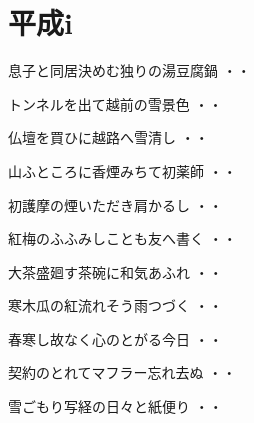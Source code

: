 \chapter{平成i}
\begin{shiika}息子と同居決めむ独りの湯豆腐鍋
\hfill{・・}\end{shiika}
\vspace{0.6cm}
\begin{shiika}トンネルを出て越前の雪景色
\hfill{・・}\end{shiika}
\vspace{0.6cm}
\begin{shiika}仏壇を買ひに越路へ雪清し
\hfill{・・}\end{shiika}
\vspace{0.6cm}
\begin{shiika}山ふところに香煙みちて初薬師
\hfill{・・}\end{shiika}
\vspace{0.6cm}
\begin{shiika}初護摩の煙いただき肩かるし
\hfill{・・}\end{shiika}
\vspace{0.6cm}
\begin{shiika}紅梅のふふみしことも友へ書く
\hfill{・・}\end{shiika}
\vspace{0.6cm}
\begin{shiika}大茶盛廻す茶碗に和気あふれ
\hfill{・・}\end{shiika}
\vspace{0.6cm}
\begin{shiika}寒木瓜の紅流れそう雨つづく
\hfill{・・}\end{shiika}
\vspace{0.6cm}
\begin{shiika}春寒し故なく心のとがる今日
\hfill{・・}\end{shiika}
\vspace{0.6cm}
\begin{shiika}契約のとれてマフラー忘れ去ぬ
\hfill{・・}\end{shiika}
\vspace{0.6cm}
\begin{shiika}雪ごもり写経の日々と紙便り
\hfill{・・}\end{shiika}
